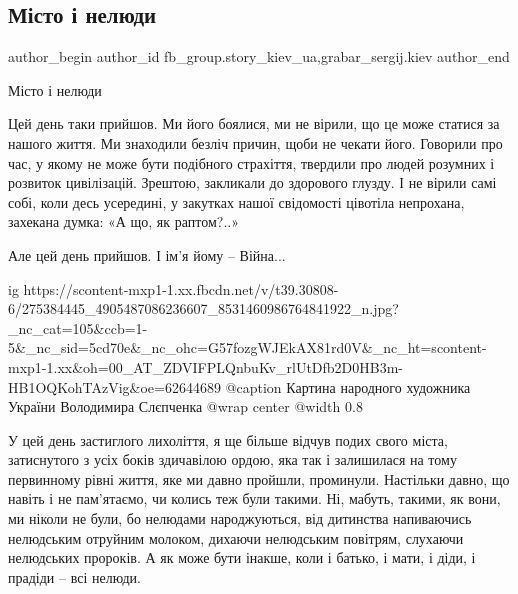  
 
 
 
 
 
\subsection{Місто і нелюди}
\label{sec:11_03_2022.fb.fb_group.story_kiev_ua.2.misto_i_neljudy}
 
\ifcmt
 author_begin
   author_id fb_group.story_kiev_ua,grabar_sergij.kiev
 author_end
\fi

Місто і нелюди

Цей день таки прийшов. Ми його боялися, ми не вірили, що це може статися за
нашого життя. Ми знаходили безліч причин, щоби не чекати його. Говорили про
час, у якому не може бути подібного страхіття, твердили про людей розумних і
розвиток цивілізацій. Зрештою, закликали до здорового глузду. І не вірили самі
собі, коли десь усередині, у закутках нашої свідомості цівотіла непрохана,
захекана думка: «А що, як раптом?..»

Але цей день прийшов. І ім’я йому – Війна...

\ifcmt
  ig https://scontent-mxp1-1.xx.fbcdn.net/v/t39.30808-6/275384445_4905487086236607_8531460986764841922_n.jpg?_nc_cat=105&ccb=1-5&_nc_sid=5cd70e&_nc_ohc=G57fozgWJEkAX81rd0V&_nc_ht=scontent-mxp1-1.xx&oh=00_AT_ZDVIFPLQnbuKv_rlUtDfb2D0HB3m-HB1OQKohTAzVig&oe=62644689
	@caption Картина народного художника України Володимира Слєпченка
  @wrap center
  @width 0.8
\fi

У цей день застиглого лихоліття, я ще більше відчув подих свого міста,
затиснутого з усіх боків здичавілою ордою, яка так і залишилася на тому
первинному рівні життя, яке ми давно пройшли, проминули. Настільки давно, що
навіть і не пам’ятаємо, чи колись теж були такими. Ні, мабуть, такими, як вони,
ми ніколи не були, бо нелюдами народжуються, від дитинства напиваючись
нелюдським отруйним молоком, дихаючи нелюдським повітрям, слухаючи нелюдських
пророків. А як може бути інакше, коли і батько, і мати, і діди, і прадіди – всі
нелюди.

